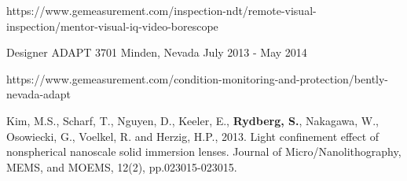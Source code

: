 \begin{cventries}
    {
      \begin{cvitems} %
        \item {https://www.gemeasurement.com/inspection-ndt/remote-visual-inspection/mentor-visual-iq-video-borescope}
      \end{cvitems}
    }
  \cventry
    {Designer} %
    {ADAPT 3701} %
    {Minden, Nevada} %
    {July 2013 - May 2014} %
    {
      \begin{cvitems} %
        \item {https://www.gemeasurement.com/condition-monitoring-and-protection/bently-nevada-adapt}
      \end{cvitems}
    }
\end{cventries}

\begin{cvcitations}
  \cvcite
    {Kim, M.S., Scharf, T., Nguyen, D., Keeler, E., \textbf{Rydberg, S.}, Nakagawa, W., Osowiecki, G., Voelkel, R. and Herzig, H.P., 2013. Light confinement effect of nonspherical nanoscale solid immersion lenses. Journal of Micro/Nanolithography, MEMS, and MOEMS, 12(2), pp.023015-023015.} %
\end{cvcitations}

